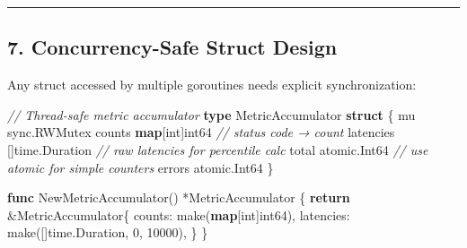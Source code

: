 \documentclass[
]{article}
\newenvironment{Shaded}{}{}
\newcommand{\BuiltInTok}[1]{\textcolor[rgb]{0.00,0.50,0.00}{#1}}
\newcommand{\CommentTok}[1]{\textcolor[rgb]{0.38,0.63,0.69}{\textit{#1}}}
\newcommand{\ControlFlowTok}[1]{\textcolor[rgb]{0.00,0.44,0.13}{\textbf{#1}}}
\newcommand{\DataTypeTok}[1]{\textcolor[rgb]{0.56,0.13,0.00}{#1}}
\newcommand{\DecValTok}[1]{\textcolor[rgb]{0.25,0.63,0.44}{#1}}
\newcommand{\KeywordTok}[1]{\textcolor[rgb]{0.00,0.44,0.13}{\textbf{#1}}}
\newcommand{\NormalTok}[1]{#1}
\newcommand{\OperatorTok}[1]{\textcolor[rgb]{0.40,0.40,0.40}{#1}}
\begin{document}
\begin{center}\rule{0.5\linewidth}{0.5pt}\end{center}

\hypertarget{concurrency-safe-struct-design}{%
\subsection{7. Concurrency-Safe Struct
Design}\label{concurrency-safe-struct-design}}

Any struct accessed by multiple goroutines needs explicit
synchronization:

\begin{Shaded}
\begin{Highlighting}[]
\CommentTok{// Thread{-}safe metric accumulator}
\KeywordTok{type}\NormalTok{ MetricAccumulator }\KeywordTok{struct} \OperatorTok{\{}
\NormalTok{    mu       sync}\OperatorTok{.}\NormalTok{RWMutex}
\NormalTok{    counts   }\KeywordTok{map}\OperatorTok{[}\DataTypeTok{int}\OperatorTok{]}\DataTypeTok{int64}     \CommentTok{// status code → count}
\NormalTok{    latencies }\OperatorTok{[]}\NormalTok{time}\OperatorTok{.}\NormalTok{Duration  }\CommentTok{// raw latencies for percentile calc}
\NormalTok{    total    atomic}\OperatorTok{.}\NormalTok{Int64      }\CommentTok{// use atomic for simple counters}
\NormalTok{    errors   atomic}\OperatorTok{.}\NormalTok{Int64}
\OperatorTok{\}}

\KeywordTok{func}\NormalTok{ NewMetricAccumulator}\OperatorTok{()} \OperatorTok{*}\NormalTok{MetricAccumulator }\OperatorTok{\{}
    \ControlFlowTok{return} \OperatorTok{\&}\NormalTok{MetricAccumulator}\OperatorTok{\{}
\NormalTok{        counts}\OperatorTok{:}    \BuiltInTok{make}\OperatorTok{(}\KeywordTok{map}\OperatorTok{[}\DataTypeTok{int}\OperatorTok{]}\DataTypeTok{int64}\OperatorTok{),}
\NormalTok{        latencies}\OperatorTok{:} \BuiltInTok{make}\OperatorTok{([]}\NormalTok{time}\OperatorTok{.}\NormalTok{Duration}\OperatorTok{,} \DecValTok{0}\OperatorTok{,} \DecValTok{10000}\OperatorTok{),}
    \OperatorTok{\}}
\OperatorTok{\}}


\end{Highlighting}
\end{Shaded}
\end{document}
